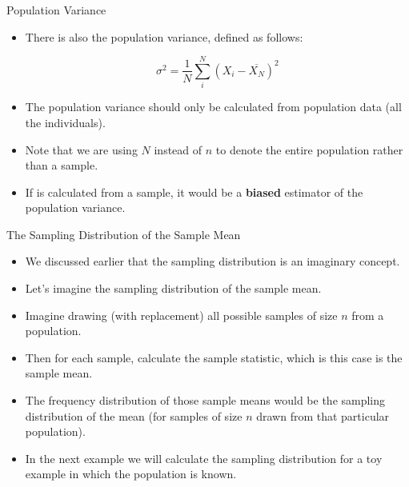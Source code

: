 \documentclass[handout]{beamer}
\begin{document}
\begin{frame}{Population Variance}
\scriptsize{
\begin{itemize}
\item There is also the population variance, defined as follows:

\begin{displaymath}
 \sigma^{2}= \frac{1}{N} \sum_{i}^{N}(X_{i}-\overline{X_{N}})^2
\end{displaymath}

\item The population variance should only be calculated from population data (all the individuals).

\item Note that we are using $N$ instead of $n$ to denote the entire population rather than a sample.

\item If is calculated from a sample, it would be a \textbf{biased} estimator of the population variance.

\end{itemize}


} 
\end{frame}


\begin{frame}[fragile]{The Sampling Distribution of the Sample Mean}
\scriptsize{

\begin{itemize}
\item We discussed earlier that the sampling distribution is an imaginary concept.
\item Let's imagine the sampling distribution of the sample mean.
\item Imagine drawing (with replacement) all possible samples of size $n$ from a population.
\item Then for each sample, calculate the sample statistic, which is this case is the sample mean. 
\item The frequency distribution of those sample means would be the sampling distribution of the mean (for samples of size $n$ drawn from that particular population).
\item In the next example we will calculate the sampling distribution for a toy example in which the population is known.
\end{itemize}


} 
\end{frame}
\end{document}

